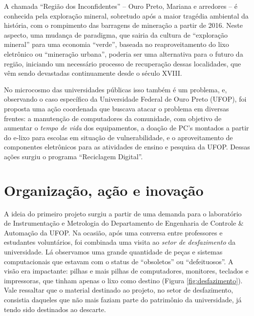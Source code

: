\documentclass[a4paper]{ifacconf}
\begin{document}
A chamada ``Região dos Inconfidentes'' -- Ouro Preto, Mariana e arredores -- é conhecida pela exploração mineral, sobretudo após a maior tragédia ambiental da história, com o rompimento das barragens de mineração a partir de 2016. Neste aspecto, uma mudança de paradigma, que sairia da cultura de ``exploração mineral'' para uma economia ``verde'', baseada no reaproveitamento do lixo eletrônico ou ``mineração urbana'', poderia ser uma alternativa para o futuro da região, iniciando um necessário processo de recuperação dessas localidades, que vêm sendo devastadas continuamente desde o século XVIII. 

No microcosmo das universidades públicas isso também é um problema, e, observando o caso específico da Universidade Federal de Ouro Preto (UFOP), foi proposta uma ação coordenada que buscava atacar o problema em diversas frentes: a manutenção de computadores da comunidade, com objetivo de aumentar o \emph{tempo de vida} dos equipamentos, 
a doação de PC's montados a partir do e-lixo para escolas em situação de vulnerabilidade, e o aproveitamento de componentes eletrônicos para as atividades de ensino e pesquisa da UFOP. Dessas ações surgiu o programa ``Reciclagem Digital''.

\section{Organização, ação e inovação}
A ideia do primeiro projeto surgiu a partir de uma demanda para o laboratório de Instrumentação e Metrologia do Departamento de Engenharia de Controle $\&$ Automação da UFOP. Na ocasião, após uma conversa entre professores e estudantes voluntários, foi combinada uma visita ao \emph{setor de desfazimento} da universidade. Lá observamos uma grande quantidade de peças e sistemas computacionais que estavam com o status de ``obsoletos'' ou ``defeituosos''. A visão era impactante: pilhas e mais pilhas de computadores, monitores, teclados e impressoras, que tinham apenas o lixo como destino (Figura \ref{fig:desfazimento}). Vale ressaltar que o material destinado ao projeto, no setor de desfazimento, consistia daqueles que não mais faziam parte do patrimônio da universidade, já tendo sido destinados ao descarte.
\end{document}
